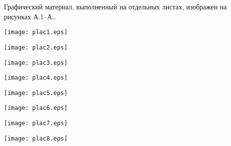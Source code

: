 
Графический материал, выполненный на отдельных листах,
изображен на рисунках А.1--А..
\setcounter{числоПлакатов}{0}

\renewcommand{\thefigure}{А.\arabic{figure}} %

\begin{landscape}

\begin{плакат}
	\texttt{[image: plac1.eps]}
	\label{plac1:image}      
\end{плакат}

\begin{плакат}
	\texttt{[image: plac2.eps]}
	\label{plac2:image}      
\end{плакат}


\begin{плакат}
	\texttt{[image: plac3.eps]}
	\label{plac3:image}      
\end{плакат}


\begin{плакат}
	\texttt{[image: plac4.eps]}
	\label{plac4:image}      
\end{плакат}


\begin{плакат}
	\texttt{[image: plac5.eps]}
	\label{plac5:image}      
\end{плакат}


\begin{плакат}
	\texttt{[image: plac6.eps]}
	\label{plac6:image}      
\end{плакат}


\begin{плакат}
	\texttt{[image: plac7.eps]}
	\label{plac7:image}      
\end{плакат}

\begin{плакат}
	\texttt{[image: plac8.eps]}
	\label{plac8:image}      
\end{плакат}

\end{landscape}
